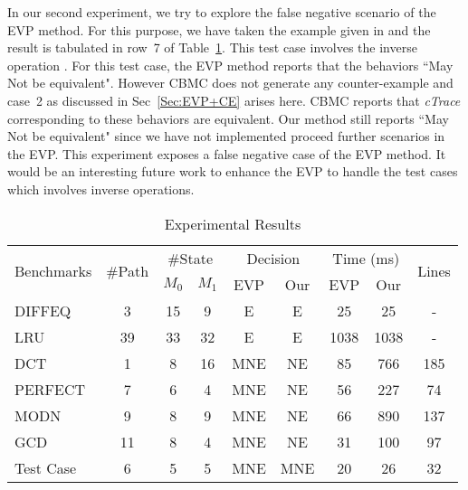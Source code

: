 In our second experiment, we try to explore the false negative scenario of the EVP
method.  For this purpose, we have taken the example given in
\cite{Banerjee18} and the result is tabulated in row~7 of 
Table~\ref{Table:res}. This test case involves the inverse operation \cite{Banerjee18}.
 For this test case, the EVP method reports that the behaviors ``May
Not be equivalent". However CBMC  does not generate any counter-example and
case~2 as discussed in Sec~\ref{Sec:EVP+CE} arises here.  CBMC reports that
\textit{cTrace} corresponding to these behaviors are equivalent. Our method
still reports ``May Not be equivalent" since we have not implemented proceed further scenarios
in the EVP. This experiment exposes a false
negative case of the EVP method. It would be an interesting future work to
enhance the EVP to handle the test cases which involves inverse operations.
\begin{table}[!t]
\caption{Experimental Results}
\label{Table:res}
\setlength\tabcolsep{3pt} %
  \centering
  \begin{tabular}{|l|c|c|c|c|c|c|c|c|}
    \hline
    \multirow{2}{*}{Benchmarks} &
    \multirow{2}{*}{\#Path} &
    \multicolumn{2}{c|}{\#State} &
    \multicolumn{2}{c|}{Decision} &
    \multicolumn{2}{c|}{Time (ms)} &
    \multirow{2}{*}{Lines}\\\cline{3-8}
    &&$M_0$&$M_1$&EVP&Our&EVP&Our&\\\hline
    DIFFEQ&3&15&9&E&E&25&25&-\\  
    LRU&39&33&32&E&E&1038&1038&-\\  
    DCT&1&8&16&MNE&NE&85&766&185\\ %
    PERFECT&7&6&4&MNE&NE&56&227&74\\  %
    MODN&9&8&9&MNE&NE&66&890&137\\ %
    GCD&11&8&4&MNE&NE&31&100&97\\\hline 
    Test Case\cite{Banerjee18}&6&5&5&MNE&MNE&20&26&32\\\hline 
  \end{tabular}
  \end{table} 





